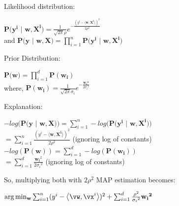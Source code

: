 \documentclass[a4paper,11pt]{article}
\begin{document}
\begin{mlsolution}
Likelihood distribution:
\begin{center}
$\mathbf{P( y^i}$ $|$ $\mathbf{w,X^i)} = \frac{1}{\sqrt{2\pi}\rho}e^{-\frac{(y^i - \langle\mathbf{w,X^i\rangle})^2}{2\rho^2}}$\\[1em]

and $\mathbf{P( y}$ $|$ $\mathbf{w,X)} = \prod_{i=1}^{n} \mathbf{P( y^i}$ $|$ $\mathbf{w,X^i)}$ \\[1 em]

\end{center}

Prior Distribution:
\begin{center}
$\textbf{P(w)} = \prod_{i=1}^{d} \mathbf{P(w_i)}$ \\[1 em]

where, $\mathbf{P(w_i)} =  \frac{1}{\sqrt{2\pi}\sigma_i}e^{-\frac{ \mathbf{{w_i}^2}}{2{\sigma_i}^2}}$ 
\end{center}

Explanation:
\begin{center}
$-log(\mathbf{P( y}$ $|$ $\mathbf{w,X)}) = \sum_{i = 1}^{n} -log(\mathbf{P(y^i}$ $|$ $\mathbf{w,X^i)})$ \\[1em]
$= \sum_{i = 1}^{n} \frac{(y^i - \langle\mathbf{w,X^i\rangle})^2}{2\rho^2}$ (ignoring log of constants)\\[2em]


$-log(\mathbf{P(w)}) = \sum_{i = 1}^{d} -log(\mathbf{P(w_i)})$ \\[1em]
$= \sum_{i = 1}^{d} \frac{\mathbf{w_i}^2}{2{\sigma_i}^2}$ (ignoring log of constants)
\end{center}

So, multiplying both with $2\rho^2$ MAP estimation becomes:
\begin{center}
$\arg\min_{\mathbf{w}} \sum_{i=1}^n(y^i - \ip{\vw}{\vx^i})^2 + \sum_{i = 1}^{d} \frac{\mathbf{\rho}^2}{{\sigma_i}^2}\mathbf{{w_i}^2}$ 
\end{center}


\end{mlsolution}
\end{document}
